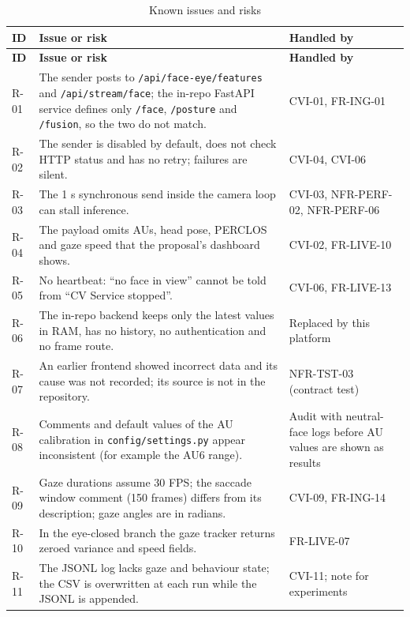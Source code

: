 \documentclass[a4paper,11pt]{scrreprt}
\newcommand{\code}[1]{\texttt{#1}}
\begin{document}
\begin{longtable}{@{}>{\ttfamily\footnotesize}p{1.1cm}>{\raggedright\arraybackslash}p{7.3cm}>{\raggedright\arraybackslash}p{6.2cm}@{}}
\caption{Known issues and risks}\label{tab:risks}\\
\toprule \textbf{ID} & \textbf{Issue or risk} & \textbf{Handled by}\\ \midrule \endfirsthead
\toprule \textbf{ID} & \textbf{Issue or risk} & \textbf{Handled by}\\ \midrule \endhead
\bottomrule \endfoot
R-01 & The sender posts to \code{/api/face-eye/features} and \code{/api/stream/face}; the in-repo FastAPI service defines only \code{/face}, \code{/posture} and \code{/fusion}, so the two do not match. & CVI-01, FR-ING-01\\ \midrule
R-02 & The sender is disabled by default, does not check HTTP status and has no retry; failures are silent. & CVI-04, CVI-06\\ \midrule
R-03 & The 1 s synchronous send inside the camera loop can stall inference. & CVI-03, NFR-PERF-02, NFR-PERF-06\\ \midrule
R-04 & The payload omits AUs, head pose, PERCLOS and gaze speed that the proposal's dashboard shows. & CVI-02, FR-LIVE-10\\ \midrule
R-05 & No heartbeat: ``no face in view'' cannot be told from ``CV Service stopped''. & CVI-06, FR-LIVE-13\\ \midrule
R-06 & The in-repo backend keeps only the latest values in RAM, has no history, no authentication and no frame route. & Replaced by this platform\\ \midrule
R-07 & An earlier frontend showed incorrect data and its cause was not recorded; its source is not in the repository. & NFR-TST-03 (contract test)\\ \midrule
R-08 & Comments and default values of the AU calibration in \code{config/settings.py} appear inconsistent (for example the AU6 range). & Audit with neutral-face logs before AU values are shown as results\\ \midrule
R-09 & Gaze durations assume 30 FPS; the saccade window comment (150 frames) differs from its description; gaze angles are in radians. & CVI-09, FR-ING-14\\ \midrule
R-10 & In the eye-closed branch the gaze tracker returns zeroed variance and speed fields. & FR-LIVE-07\\ \midrule
R-11 & The JSONL log lacks gaze and behaviour state; the CSV is overwritten at each run while the JSONL is appended. & CVI-11; note for experiments\\ \midrule

\end{longtable}
\end{document}
